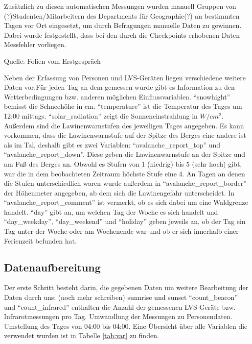 \documentclass[12pt]{article}
\begin{document}
	Zusätzlich zu diesen automatischen Messungen wurden manuell Gruppen von (?)Studenten/Mitarbeitern des Departments für Geographie(?) an bestimmten Tagen vor Ort eingesetzt, um durch Befragungen manuelle Daten zu gewinnen. Dabei wurde festgestellt, dass bei den durch die Checkpoints erhobenen Daten Messfehler vorliegen.
	
	Quelle:
	Folien vom Erstgespräch
	
	Neben der Erfassung von Personen und LVS-Geräten liegen verschiedene weitere Daten vor.Für jeden Tag an dem gemessen wurde gibt es Information zu den Wetterbedingungen bzw. anderen möglichen Einflussvariablen. "`snowhight"' bemisst die Schneehöhe in cm. "`temperature"' ist die Temperatur des Tages um 12:00 mittags. "`solar\_radiation"' zeigt die Sonneneinstrahlung in $W/cm^2$. Außerdem sind die Lawinenwarnstufen des jeweiligen Tages angegeben. Es kann vorkommen, dass die Lawinenwarnstufe auf der Spitze des Berges eine andere ist als im Tal, deshalb gibt es zwei Variablen: "`avalanche\_report\_top"' und "`avalanche\_report\_down"'. Diese geben die Lawinenwarnstufe an der Spitze und am Fuß des Berges an. Obwohl es Stufen von 1 (niedrig) bis 5 (sehr hoch) gibt, war die in dem beobachteten Zeitraum höchste Stufe eine 4. An Tagen an denen die Stufen unterschiedlich waren wurde außerdem in "`avalanche\_report\_border"' der Höhenmeter angegeben, ab dem sich die Lawinengefahr unterscheidet. In "`avalanche\_report\_comment"' ist vermerkt, ob es sich dabei um eine Waldgrenze handelt. "`day"' gibt an, um welchen Tag der Woche es sich handelt und "`day\_weekday"', "`day\_weekend"' und "`holiday"' geben jeweils an, ob der Tag ein Tag unter der Woche oder am Wochenende war und ob er sich innerhalb einer Ferienzeit befunden hat.
	
	\subsection{Datenaufbereitung}
	Der erste Schritt besteht darin, die gegebenen Daten um weitere 
	Bearbeitung der Daten durch uns:
	(noch mehr schreiben)
	sunnrise und sunset
	"`count\_beacon"' und "`count\_infrared"' enthalten die Anzahl der gemessenen LVS-Geräte bzw. Infrarotmessungen pro Tag.
	Umwandlung der Messungen zu Personendaten. Umstellung des Tages von 04:00 bis 04:00.
	Eine Übersicht über alle Variablen die verwendet wurden ist in Tabelle  \ref{tab:var} zu finden.
	
\end{document}
